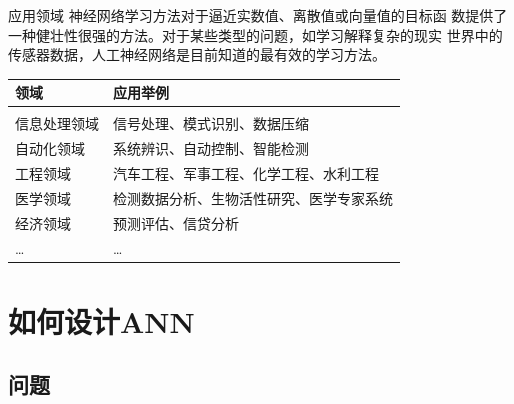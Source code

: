 \documentclass[xcolor=svgnames]{beamer}
\begin{document}
\begin{frame}{应用领域}
  \setlength\parindent{2em}
  神经网络学习方法对于逼近实数值、离散值或向量值的目标函
  数提供了一种健壮性很强的方法。对于某些类型的问题，如学习解释复杂的现实
  世界中的传感器数据，人工神经网络是目前知道的最有效的学习方法。

  \begin{center}
  \begin{tabular}{l|l}
    \hline 
    领域 & 应用举例 \\
    \hline \hline
    \\
    信息处理领域&信号处理、模式识别、数据压缩\\
    自动化领域&系统辨识、自动控制、智能检测\\
    工程领域&汽车工程、军事工程、化学工程、水利工程\\
    医学领域&检测数据分析、生物活性研究、医学专家系统\\
    经济领域&预测评估、信贷分析\\
    \ldots & \ldots \\
    \hline
  \end{tabular}
\end{center}
\end{frame}

\section{如何设计ANN}
\label{sec:how}

\subsection{问题}
\end{document}
